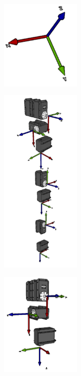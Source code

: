 \documentclass[user_manual.tex]{subfiles}
\begin{document}
\begin{center}
\includegraphics[width=0.3\textwidth]{Figures/Hardware/Cinematica/Cine_1.png}
\end{center}

\newpage

\begin{center}
\includegraphics[width=0.3\textwidth]{Figures/Hardware/Cinematica/Cine_2.png}
\end{center}

\begin{center}
\includegraphics[width=0.3\textwidth]{Figures/Hardware/Cinematica/Cine_3.png}
\end{center}
\end{document}
